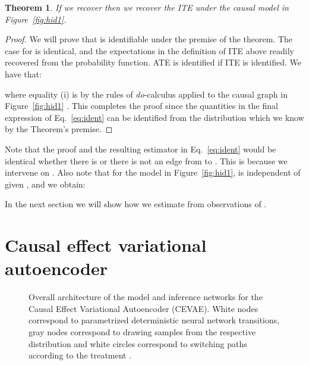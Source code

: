 \documentclass{article}
\newtheorem{theorem}{Theorem}
\begin{document}
\begin{theorem}
If we recover  then we recover the ITE under the causal model in Figure~\ref{fig:hid1}.
\end{theorem}
\begin{proof}
We will prove that  is identifiable under the premise of the theorem. The case for  is identical, and the expectations in the definition of ITE above  readily recovered from the probability function. ATE is identified if ITE is identified.
We have that:


where equality (i) is by the rules of \emph{do}-calculus applied to the causal graph in Figure~\ref{fig:hid1} \citep{pearl2009causality}. This completes the proof since the quantities in the final expression of Eq.~\eqref{eq:ident} can be identified from the distribution   which we know by the Theorem's premise.
\end{proof}
Note that the proof and the resulting estimator in Eq.~\eqref{eq:ident} would be identical whether there is or there is not an edge from  to . This is because we intervene on .
Also note that for the model in Figure~\ref{fig:hid1},  is independent of  given , and we obtain:

In the next section we will show how we estimate   from observations of .

 
\section{Causal effect variational autoencoder}
\begin{figure*}[htb!]
\centering
\hspace*{\fill}\hfill {}
 \hspace*{\fill}\caption{Overall architecture of the model and inference networks for the Causal Effect Variational Autoencoder (CEVAE). White nodes correspond to parametrized deterministic neural network transitions, gray nodes correspond to drawing samples from the respective distribution and white circles correspond to switching paths according to the treatment .} \label{fig:cevae}
\end{figure*}
\end{document}
